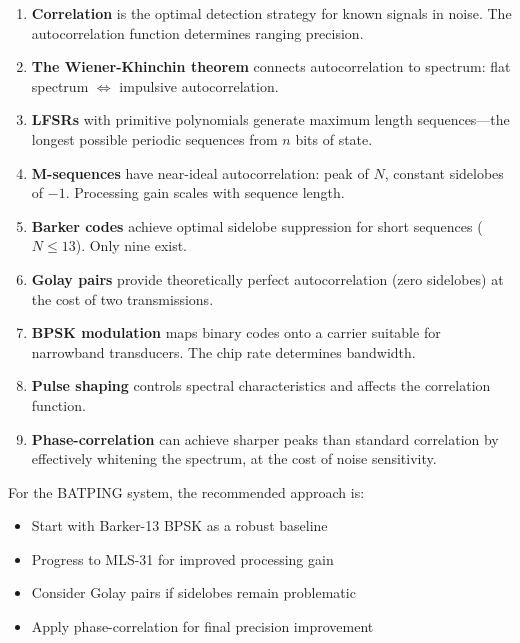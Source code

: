 \documentclass[11pt]{article}
\begin{document}
\begin{enumerate}
    \item \textbf{Correlation} is the optimal detection strategy for known signals in noise. The autocorrelation function determines ranging precision.

    \item \textbf{The Wiener-Khinchin theorem} connects autocorrelation to spectrum: flat spectrum $\Leftrightarrow$ impulsive autocorrelation.

    \item \textbf{LFSRs} with primitive polynomials generate maximum length sequences---the longest possible periodic sequences from $n$ bits of state.

    \item \textbf{M-sequences} have near-ideal autocorrelation: peak of $N$, constant sidelobes of $-1$. Processing gain scales with sequence length.

    \item \textbf{Barker codes} achieve optimal sidelobe suppression for short sequences ($N \leq 13$). Only nine exist.

    \item \textbf{Golay pairs} provide theoretically perfect autocorrelation (zero sidelobes) at the cost of two transmissions.

    \item \textbf{BPSK modulation} maps binary codes onto a carrier suitable for narrowband transducers. The chip rate determines bandwidth.

    \item \textbf{Pulse shaping} controls spectral characteristics and affects the correlation function.

    \item \textbf{Phase-correlation} can achieve sharper peaks than standard correlation by effectively whitening the spectrum, at the cost of noise sensitivity.
\end{enumerate}

For the BATPING system, the recommended approach is:
\begin{itemize}
    \item Start with Barker-13 BPSK as a robust baseline
    \item Progress to MLS-31 for improved processing gain
    \item Consider Golay pairs if sidelobes remain problematic
    \item Apply phase-correlation for final precision improvement
\end{itemize}
\end{document}
